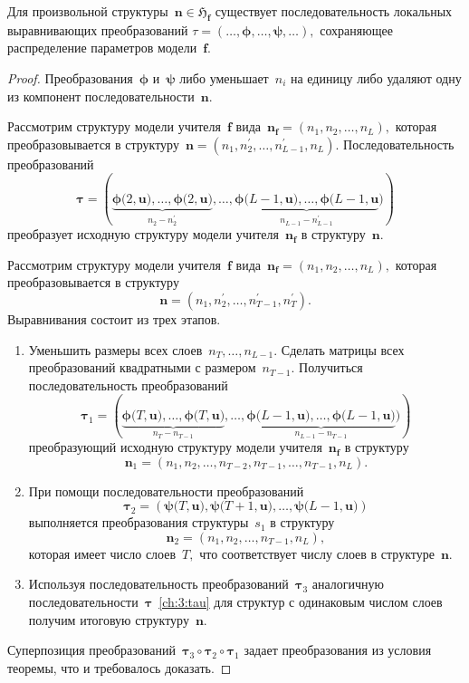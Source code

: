 \begin{theorem}
\label{th-9:visual}
Для произвольной структуры~$\mathbf{n} \in \mathfrak{H}_{\mathbf{f}}$ существует последовательность локальных выравнивающих преобразований $\tau = (\ldots, \bm{\phi}, \ldots, \bm{\psi}, \ldots),$ сохраняющее распределение параметров модели~$\mathbf{f}$.
\end{theorem}
\begin{proof}
Преобразования~$\bm{\phi}$ и~$\bm{\psi}$ либо уменьшает~$n_i$ на единицу либо удаляют одну из компонент последовательности~$\mathbf{n}$.

Рассмотрим структуру модели учителя~$\mathbf{f}$ вида~$\mathbf{n}_{\mathbf{f}}=\left(n_1, n_2, \ldots, n_L\right),$ которая преобразовывается в структуру~$\mathbf{n}=\left(n_1, n^{'}_2, \ldots, n^{'}_{L-1}, n_L\right).$ Последовательность преобразований
\[
\label{ch:3:tau}
\bm{\tau} = \left(\underbrace{\bm{\phi}\bigr(2, \mathbf{u}\bigr), \ldots, \bm{\phi}\bigr(2, \mathbf{u}\bigr)}_{n_2-n^{'}_2}, \ldots, \underbrace{\bm{\phi}\bigr(L-1, \mathbf{u}\bigr), \ldots, \bm{\phi}\bigr(L-1, \mathbf{u}}_{n_{L-1}-n^{'}_{L-1}}\bigr) \right)
\]
преобразует исходную структуру модели учителя~$\mathbf{n}_{\mathbf{f}}$ в структуру~$\mathbf{n}.$

Рассмотрим структуру модели учителя~$\mathbf{f}$ вида~$\mathbf{n}_{\mathbf{f}}=\left(n_1, n_2, \ldots, n_L\right),$ которая преобразовывается в структуру
\[
    \mathbf{n}=\left(n_1, n^{'}_2, \ldots, n^{'}_{T-1}, n^{'}_T\right).
\]
Выравнивания состоит из трех этапов.
\begin{enumerate}[1.]
    \item Уменьшить размеры всех слоев~$n_{T},\ldots,n_{L-1}.$ Сделать матрицы всех преобразований квадратными с размером~$n_{T-1}.$ Получиться последовательность преобразований
    \[
        \bm{\tau}_1 = \left(\underbrace{\bm{\phi}\bigr(T, \mathbf{u}\bigr), \ldots, \bm{\phi}\bigr(T, \mathbf{u}\bigr)}_{n_{T}-n_{T-1}}, \ldots, \underbrace{\bm{\phi}\bigr(L-1, \mathbf{u}\bigr), \ldots, \bm{\phi}\bigr(L-1, \mathbf{u}\bigr)}_{n_{L-1}-n_{T-1}}\bigr) \right)
    \]
    преобразующий исходную структуру модели учителя~$\mathbf{n}_{\mathbf{f}}$ в структуру
    \[
        \mathbf{n}_\text{1} = \left(n_1, n_2, \ldots, n_{T-2}, n_{T-1}, \ldots, n_{T-1}, n_L\right).
    \]
    \item При помощи последовательности преобразований
    \[
        \bm{\tau}_2 = \left(\bm{\psi}\bigr(T, \mathbf{u}\bigr), \bm{\psi}\bigr(T+1, \mathbf{u}\bigr), \ldots, \bm{\psi}\bigr(L-1, \mathbf{u}\bigr) \right)
    \]
    выполняется преобразования структуры~$s_1$ в структуру
    \[
        \mathbf{n}_\text{2} = \left(n_1, n_2, \ldots, n_{T-1}, n_L\right),
    \]
    которая имеет число слоев~$T,$ что соответствует числу слоев в структуре~$\mathbf{n}$.
    \item Используя последовательность преобразований~$\bm{\tau}_3$ аналогичную последовательности~$\bm{\tau}$~\eqref{ch:3:tau} для структур с одинаковым числом слоев получим итоговую структуру~$\mathbf{n}.$
\end{enumerate}
Суперпозиция преобразований~$\bm{\tau}_3\circ\bm{\tau}_2\circ\bm{\tau}_1$ задает преобразования из условия теоремы, что и требовалось доказать.


\end{proof}
